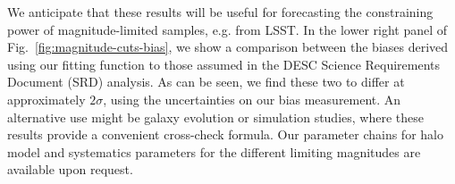 \documentclass[a4paper,11pt]{article}
\begin{document}
    We anticipate that these results will be useful for forecasting the constraining power of magnitude-limited samples, e.g. from LSST. In the lower right panel of Fig.~\ref{fig:magnitude-cuts-bias}, we show a comparison between the biases derived using our fitting function to those assumed in the DESC Science Requirements Document (SRD) \cite{LSST:SRD:2018} analysis. As can be seen, we find these two to differ at approximately $2 \sigma$, using the uncertainties on our bias measurement. An alternative use might be galaxy evolution or simulation studies, where these results provide a convenient cross-check formula. Our parameter chains for halo model and systematics parameters for the different limiting magnitudes are available upon request. 
\end{document}
